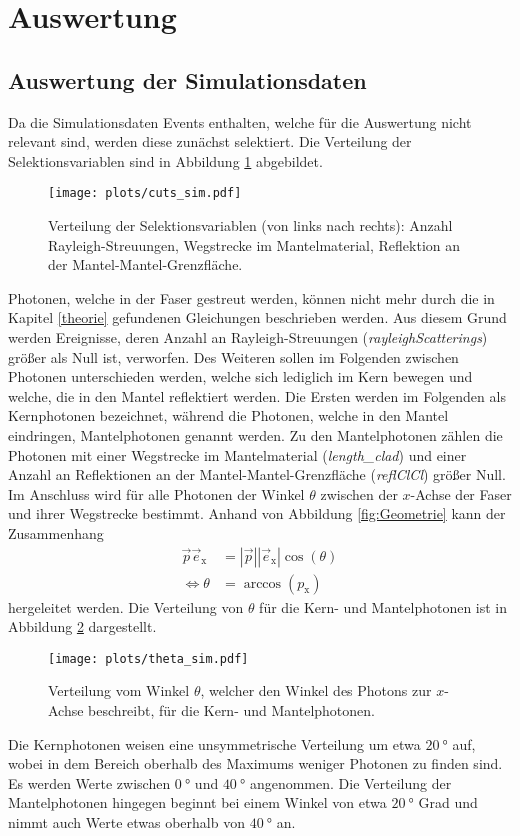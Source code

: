 \section{Auswertung}

\subsection{Auswertung der Simulationsdaten}
Da die Simulationsdaten Events enthalten, welche für die Auswertung nicht relevant sind, werden diese zunächst selektiert. Die Verteilung der Selektionsvariablen sind in Abbildung \ref{fig:Cuts_sim} abgebildet.
\begin{figure}
    \centering
    \texttt{[image: plots/cuts\_sim.pdf]}
    \caption{Verteilung der Selektionsvariablen (von links nach rechts): Anzahl Rayleigh-Streuungen, Wegstrecke im Mantelmaterial, Reflektion an der Mantel-Mantel-Grenzfläche.}
    \label{fig:Cuts_sim}
  \end{figure} 
  \FloatBarrier
Photonen, welche in der Faser gestreut werden, können nicht mehr durch die in Kapitel \ref{theorie} gefundenen Gleichungen beschrieben werden. Aus diesem Grund werden Ereignisse, deren Anzahl an Rayleigh-Streuungen (\textit{rayleighScatterings}) größer als Null ist, verworfen.
Des Weiteren sollen im Folgenden zwischen Photonen unterschieden werden, welche sich lediglich im Kern bewegen und welche, die in den Mantel reflektiert werden. Die Ersten werden im Folgenden als Kernphotonen bezeichnet, während die Photonen, welche in den Mantel eindringen, Mantelphotonen genannt werden.
Zu den Mantelphotonen zählen die Photonen mit einer Wegstrecke im Mantelmaterial (\textit{length\_clad}) und einer Anzahl an Reflektionen an der Mantel-Mantel-Grenzfläche (\textit{reflClCl}) größer Null. \\

Im Anschluss wird für alle Photonen der Winkel $\theta$ zwischen der $x$-Achse der Faser und ihrer Wegstrecke bestimmt. Anhand von Abbildung \ref{fig:Geometrie} kann der Zusammenhang 
\begin{align}
    \vec{p}\vec{e}_\mathrm{x} &= |\vec{p}||\vec{e}_\mathrm{x}| \cos(\theta) \\
    \Leftrightarrow \theta &= \arccos(p_\mathrm{x}) 
\end{align}
hergeleitet werden. Die Verteilung von $\theta$ für die Kern- und Mantelphotonen ist in Abbildung \ref{fig:theta_sim} dargestellt.
\begin{figure}
    \centering
    \texttt{[image: plots/theta\_sim.pdf]}
    \caption{Verteilung vom Winkel $\theta$, welcher den Winkel des Photons zur $x$-Achse beschreibt, für die Kern- und Mantelphotonen.}
    \label{fig:theta_sim}
\end{figure} 
\FloatBarrier
Die Kernphotonen weisen eine unsymmetrische Verteilung um etwa $\SI{20}{°}$ auf, wobei in dem Bereich oberhalb des Maximums weniger Photonen zu finden sind. Es werden Werte zwischen $\SI{0}{°}$ und $\SI{40}{°}$ angenommen. Die Verteilung der Mantelphotonen hingegen beginnt bei einem Winkel von etwa $\SI{20}{°}$ Grad und nimmt auch Werte etwas oberhalb von $\SI{40}{°}$ an.\\

